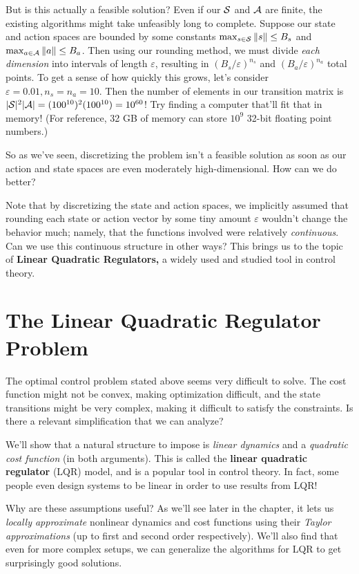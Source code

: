 \documentclass[../main/main]{subfiles}
\begin{document}
But is this actually a feasible solution? Even if our $\S$ and $\A$ are
finite, the existing algorithms might take unfeasibly long to complete.
Suppose our state and action spaces
are bounded by some constants $\max_{s \in \S} \|s\| \le B_s$ and
$\max_{a \in \A} \|a\| \le B_a$.
Then using our rounding method, we must divide \emph{each dimension} into intervals of length $\varepsilon$,
resulting in $(B_s/\varepsilon)^{n_s}$ and $(B_a/\varepsilon)^{n_a}$ total points.
To get a sense of how quickly this grows, let's consider $\varepsilon = 0.01, n_s = n_a = 10$. Then the number of elements in our transition matrix is $|\S|^2 |\A| = (100^{10})^2 (100^{10}) = 10^{60}$!
Try finding a computer that'll fit that in memory! (For reference, 32 GB of memory can store $10^9$ 32-bit floating point numbers.)

So as we've seen, discretizing the problem isn't a feasible solution as soon as
our action and state spaces are even moderately high-dimensional.
How can we do better?

Note that by discretizing the state and action spaces, we implicitly assumed that rounding each state or action vector by some tiny amount $\varepsilon$
wouldn't change the behavior much; namely, that the functions involved were relatively \emph{continuous}.
Can we use this continuous structure in other ways? This brings us to the topic of \textbf{Linear Quadratic Regulators,} a widely used and studied tool in control theory.

\section{The Linear Quadratic Regulator Problem} \label{sec:lqr}

The optimal control problem stated above seems very difficult to solve.
The cost function might not be convex, making optimization difficult,
and the state transitions might be very complex, making it difficult to satisfy the constraints.
Is there a relevant simplification that we can analyze?

We'll show that a natural structure to impose is \emph{linear dynamics} and a \emph{quadratic cost function} (in both arguments). This is called the \textbf{linear quadratic regulator} (LQR) model, and is a popular tool in control theory.
In fact, some people even design systems to be linear in order to use results from LQR!

Why are these assumptions useful? As we'll see later in the chapter, it lets us \emph{locally approximate} nonlinear dynamics and cost functions
using their \emph{Taylor approximations} (up to first and second order respectively).
We'll also find that even for more complex setups,
we can generalize the algorithms for LQR to get surprisingly good solutions.
\end{document}

